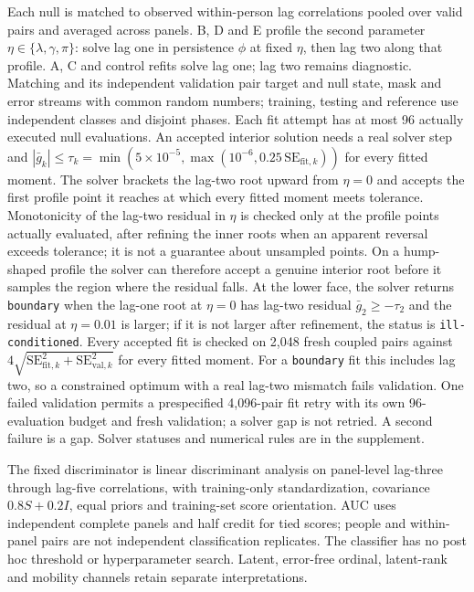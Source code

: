 Each null is matched to observed within-person lag correlations pooled over valid pairs and averaged across panels. %
B, D and E profile the second parameter $\eta\in\{\lambda,\gamma,\pi\}$: solve lag one in persistence $\phi$ at fixed $\eta$, then lag two along that profile. %
A, C and control refits solve lag one; lag two remains diagnostic. %
Matching and its independent validation pair target and null state, mask and error streams with common random numbers; training, testing and reference use independent classes and disjoint phases. %
Each fit attempt has at most 96 actually executed null evaluations. %
An accepted interior solution needs a real solver step and $|\bar g_k|\leq\tau_k=\min(5\times10^{-5},\max(10^{-6},0.25\,\mathrm{SE}_{\mathrm{fit},k}))$ for every fitted moment. %
The solver brackets the lag-two root upward from $\eta=0$ and accepts the first profile point it reaches at which every fitted moment meets tolerance. %
Monotonicity of the lag-two residual in $\eta$ is checked only at the profile points actually evaluated, after refining the inner roots when an apparent reversal exceeds tolerance; it is not a guarantee about unsampled points. %
On a hump-shaped profile the solver can therefore accept a genuine interior root before it samples the region where the residual falls. %
At the lower face, the solver returns \texttt{boundary} when the lag-one root at $\eta=0$ has lag-two residual $\bar g_2\geq-\tau_2$ and the residual at $\eta=0.01$ is larger; if it is not larger after refinement, the status is \texttt{ill-conditioned}. %
Every accepted fit is checked on 2,048 fresh coupled pairs against $4\sqrt{\mathrm{SE}_{\mathrm{fit},k}^2+\mathrm{SE}_{\mathrm{val},k}^2}$ for every fitted moment. %
For a \texttt{boundary} fit this includes lag two, so a constrained optimum with a real lag-two mismatch fails validation. %
One failed validation permits a prespecified 4,096-pair fit retry with its own 96-evaluation budget and fresh validation; a solver gap is not retried. %
A second failure is a gap. %
Solver statuses and numerical rules are in the supplement. %

The fixed discriminator is linear discriminant analysis on panel-level lag-three through lag-five correlations, with training-only standardization, covariance $0.8S+0.2I$, equal priors and training-set score orientation. %
AUC uses independent complete panels and half credit for tied scores; people and within-panel pairs are not independent classification replicates. %
The classifier has no post hoc threshold or hyperparameter search. %
Latent, error-free ordinal, latent-rank and mobility channels retain separate interpretations. %

